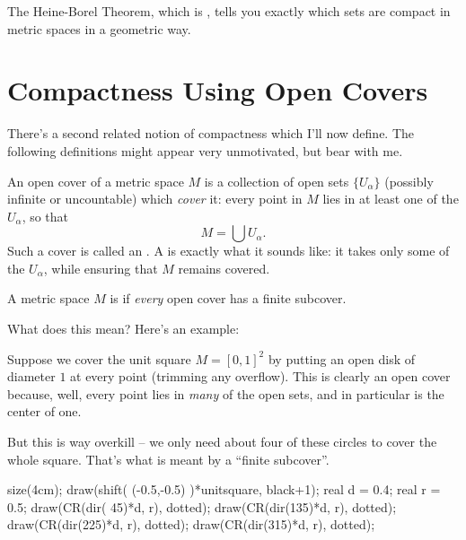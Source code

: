 The Heine-Borel Theorem, which is , tells you exactly
which sets are compact in metric spaces in a geometric way.

\section{Compactness Using Open Covers}
There's a second related notion of compactness which I'll now define.
The following definitions might appear very unmotivated, but bear with me.
\begin{definition}
	An open cover of a metric space $M$ is a collection of open sets $\{U_\alpha\}$
	(possibly infinite or uncountable) which \emph{cover} it:
	every point in $M$ lies in at least one of the $U_\alpha$, 
	so that \[ M = \bigcup U_\alpha. \]
	Such a cover is called an .
	A  is exactly what it sounds like:
	it takes only some of the $U_\alpha$,
	while ensuring that $M$ remains covered.
\end{definition}
\begin{definition}
	A metric space $M$ is  if \emph{every} open cover has a finite subcover.
\end{definition}

What does this mean? Here's an example:
\begin{example}
	Suppose we cover the unit square $M = [0,1]^2$ by putting an open disk of diameter $1$ at every point
	(trimming any overflow).
	This is clearly an open cover because, well, every point lies in \emph{many} of the open sets,
	and in particular is the center of one.

	But this is way overkill -- we only need about four of these circles to cover the whole square.
	That's what is meant by a ``finite subcover''.
	\begin{center}
		\begin{asy}
			size(4cm);
			draw(shift( (-0.5,-0.5) )*unitsquare, black+1);
			real d = 0.4;
			real r = 0.5;
			draw(CR(dir( 45)*d, r), dotted);
			draw(CR(dir(135)*d, r), dotted);
			draw(CR(dir(225)*d, r), dotted);
			draw(CR(dir(315)*d, r), dotted);
		\end{asy}
	\end{center}
\end{example}

